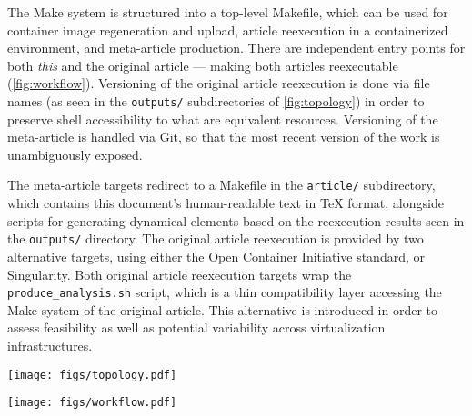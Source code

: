 The Make system is structured into a top-level Makefile, which can be used for container image regeneration and upload, article reexecution in a containerized environment, and meta-article production.
There are independent entry points for both \emph{this} and the original article — making both articles reexecutable (\cref{fig:workflow}).
Versioning of the original article reexecution is done via file names (as seen in the \texttt{outputs/} subdirectories of \cref{fig:topology}) in order to preserve shell accessibility to what are equivalent resources.
Versioning of the meta-article is handled via Git, so that the most recent version of the work is unambiguously exposed.

The meta-article targets redirect to a Makefile in the \texttt{article/} subdirectory, which contains this document's human-readable text in \TeX{} format, alongside scripts for generating dynamical elements based on the reexecution results seen in the \texttt{outputs/} directory.
The original article reexecution is provided by two alternative targets, using either the Open Container Initiative standard, or Singularity.
Both original article reexecution targets wrap the \texttt{produce\_analysis.sh} script, which is a thin compatibility layer accessing the Make system of the original article.
This alternative is introduced in order to assess feasibility as well as potential variability across virtualization infrastructures.


\begin{figure*}
	\centering
	\texttt{[image: figs/topology.pdf]}
	\caption{
		\textbf{The directory topology of the new reexecution system nests all resources and includes a Make system for process coordination.}
		Depicted is the directory tree topology of the repository coordinating OPFVTA reexecution.
		Nested directories are represented by nested boxes, and Git submodules are highlighted in orange.
		The article reexecution PDF results are highlighted in light green, and the PDF of the resulting meta-article (i.e. this article) is highlighted in light blue.
	}
	\label{fig:topology}
\end{figure*}


\begin{figure*}
	\centering
	\texttt{[image: figs/workflow.pdf]}
	\caption{
		\textbf{The reexecution system encompasses both the Original Article and Meta-Article as independent Make targets.}
		Depicted is the reexecution system workflow, with two reexecution entry points, the “Original Article and the “Meta-Article” (i.e. \textit{this} article, which also performs the reproduction assessment).
		Notably, for the generation of the meta-article, the Original Article can be executed, or not — the meta-article will dynamically include all reexecution results which are published, as well as all which are locally produced.
		The article reexecution PDF results are highlighted in light green, and the PDF of the resulting meta-article (i.e. this article) is highlighted in light blue.
		Optional nodes (such as fetching a container image for meta-article reexecution) are faded gray.
	}
	\label{fig:workflow}
\end{figure*}


